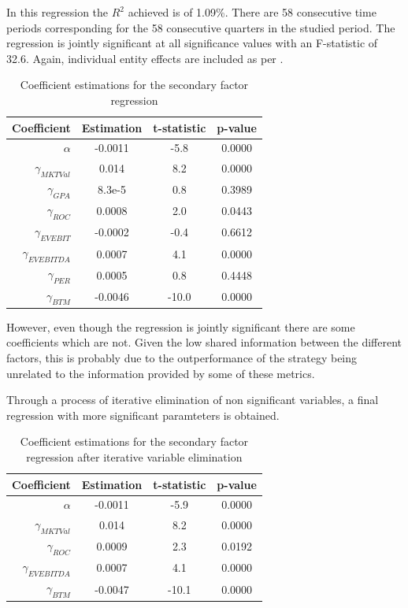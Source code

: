 In this regression the $R^2$ achieved is of 1.09\%. There are 58 consecutive time periods corresponding for the 58 consecutive quarters in the studied period. The regression is jointly significant at all significance values with an F-statistic of 32.6. Again, individual entity effects are included as per \cite{ian_wagner_2019}. 
\begin{table}[ht]
    \centering
    \begin{tabular}{rccc}
        \toprule
        Coefficient & Estimation & t-statistic & p-value \\ 
        \midrule
        $\alpha$ & -0.0011 & -5.8 & 0.0000 \\
        $\gamma_{MKTVal}$ & 0.014 & 8.2 & 0.0000 \\
        $\gamma_{GPA}$ & 8.3e-5 & 0.8 & 0.3989 \\
        $\gamma_{ROC}$ & 0.0008 & 2.0 & 0.0443 \\
        $\gamma_{EVEBIT}$ & -0.0002 & -0.4 & 0.6612 \\
        $\gamma_{EVEBITDA}$ & 0.0007 & 4.1 & 0.0000 \\
        $\gamma_{PER}$ & 0.0005 & 0.8 & 0.4448 \\
        $\gamma_{BTM}$ & -0.0046 & -10.0 & 0.0000 \\
        \bottomrule
    \end{tabular}
    \caption{Coefficient estimations for the secondary factor regression}
    \label{table:secondary-regression-results-1}
\end{table}

However, even though the regression is jointly significant there are some coefficients which are not. Given the low shared information between the different factors, this is probably due to the outperformance of the strategy being unrelated to the information provided by some of these metrics. 

Through a process of iterative elimination of non significant variables, a final regression with more significant paramteters is obtained. 

\begin{table}[ht]
    \centering
    \begin{tabular}{rccc}
        \toprule
        Coefficient & Estimation & t-statistic & p-value \\ 
        \midrule
        $\alpha$ & -0.0011 & -5.9 & 0.0000 \\
        $\gamma_{MKTVal}$ & 0.014 & 8.2 & 0.0000 \\
        $\gamma_{ROC}$ & 0.0009 & 2.3 & 0.0192 \\
        $\gamma_{EVEBITDA}$ & 0.0007 & 4.1 & 0.0000 \\
        $\gamma_{BTM}$ & -0.0047 & -10.1 & 0.0000 \\
        \bottomrule
    \end{tabular}
    \captionsetup{justification=centering}
    \caption{Coefficient estimations for the secondary factor regression after iterative variable elimination}
    \label{table:secondary-regression-results-2}
\end{table}

